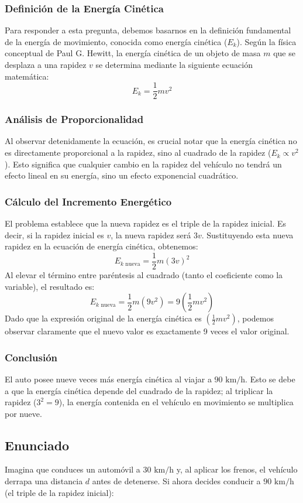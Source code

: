 \documentclass[a4paper,12pt]{article}
\begin{document}
\subsubsection*{Definición de la Energía Cinética}
Para responder a esta pregunta, debemos basarnos en la definición fundamental de la energía de movimiento, conocida como energía cinética ($E_k$). Según la física conceptual de Paul G. Hewitt, la energía cinética de un objeto de masa $m$ que se desplaza a una rapidez $v$ se determina mediante la siguiente ecuación matemática:
$$E_k = \frac{1}{2} m v^2$$

\subsubsection*{Análisis de Proporcionalidad}
Al observar detenidamente la ecuación, es crucial notar que la energía cinética no es directamente proporcional a la rapidez, sino al cuadrado de la rapidez ($E_k \propto v^2$). Esto significa que cualquier cambio en la rapidez del vehículo no tendrá un efecto lineal en su energía, sino un efecto exponencial cuadrático.

\subsubsection*{Cálculo del Incremento Energético}
El problema establece que la nueva rapidez es el triple de la rapidez inicial. Es decir, si la rapidez inicial es $v$, la nueva rapidez será $3v$. 
Sustituyendo esta nueva rapidez en la ecuación de energía cinética, obtenemos:
$$E_{k\text{ nueva}} = \frac{1}{2} m (3v)^2$$
Al elevar el término entre paréntesis al cuadrado (tanto el coeficiente como la variable), el resultado es:
$$E_{k\text{ nueva}} = \frac{1}{2} m (9 v^2) = 9 \left( \frac{1}{2} m v^2 \right)$$
Dado que la expresión original de la energía cinética es $(\frac{1}{2} m v^2)$, podemos observar claramente que el nuevo valor es exactamente 9 veces el valor original. 

\subsubsection*{Conclusión}
El auto posee nueve veces más energía cinética al viajar a $90\text{ km/h}$. Esto se debe a que la energía cinética depende del cuadrado de la rapidez; al triplicar la rapidez ($3^2 = 9$), la energía contenida en el vehículo en movimiento se multiplica por nueve.

\newpage
\subsection*{Enunciado}
Imagina que conduces un automóvil a $30\text{ km/h}$ y, al aplicar los frenos, el vehículo derrapa una distancia $d$ antes de detenerse. Si ahora decides conducir a $90\text{ km/h}$ (el triple de la rapidez inicial):
\end{document}
